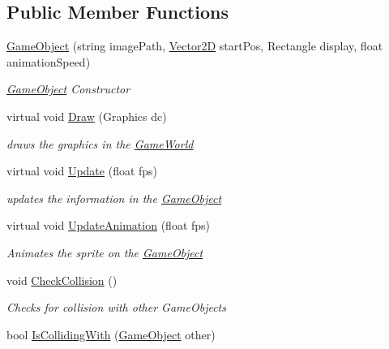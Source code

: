 \subsection*{Public Member Functions}
\begin{DoxyCompactItemize}
\item 
\hyperlink{class_mage_twinstick_1_1_game_object_a70fd6f506e37d368c4b5dc324286e0ec}{Game\+Object} (string image\+Path, \hyperlink{class_mage_twinstick_1_1_vector2_d}{Vector2\+D} start\+Pos, Rectangle display, float animation\+Speed)
\begin{DoxyCompactList}\small\item\em \hyperlink{class_mage_twinstick_1_1_game_object}{Game\+Object} Constructor \end{DoxyCompactList}\item 
virtual void \hyperlink{class_mage_twinstick_1_1_game_object_a11628f4d9b508e2d976ca25f716b74f5}{Draw} (Graphics dc)
\begin{DoxyCompactList}\small\item\em draws the graphics in the \hyperlink{class_mage_twinstick_1_1_game_world}{Game\+World} \end{DoxyCompactList}\item 
virtual void \hyperlink{class_mage_twinstick_1_1_game_object_a3de8248d06d234f8335525bbb28ccacc}{Update} (float fps)
\begin{DoxyCompactList}\small\item\em updates the information in the \hyperlink{class_mage_twinstick_1_1_game_object}{Game\+Object} \end{DoxyCompactList}\item 
virtual void \hyperlink{class_mage_twinstick_1_1_game_object_a35d6d9af3335b978c618ab73da1215a0}{Update\+Animation} (float fps)
\begin{DoxyCompactList}\small\item\em Animates the sprite on the \hyperlink{class_mage_twinstick_1_1_game_object}{Game\+Object} \end{DoxyCompactList}\item 
void \hyperlink{class_mage_twinstick_1_1_game_object_a5ed64726e236792a162c2899b7446d66}{Check\+Collision} ()
\begin{DoxyCompactList}\small\item\em Checks for collision with other Game\+Objects \end{DoxyCompactList}\item 
bool \hyperlink{class_mage_twinstick_1_1_game_object_a024097f67b0a8b2f38451e8df05b6b1d}{Is\+Colliding\+With} (\hyperlink{class_mage_twinstick_1_1_game_object}{Game\+Object} other)

\end{DoxyCompactItemize}
